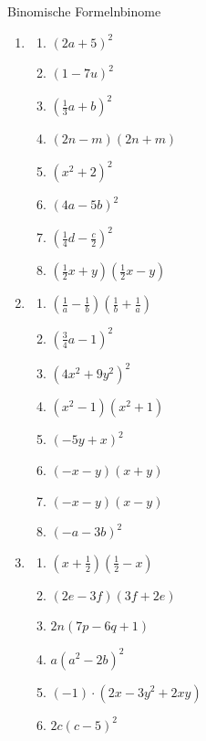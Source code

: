 \clearpage
\begin{ueb}
    {Binomische Formeln}{binome}
    \begin{enumerate}
        \item
              \begin{enumerate}
                  \item \((2a+5)^2\)
                  \item \((1-7u)^2\)
                  \item \(\left(\frac{1}{3}a+b\right)^2\)
                  \item \((2n-m)(2n+m)\)
                  \item \((x^2+2)^2\)
                  \item \((4a-5b)^2\)
                  \item \(\left(\frac{1}{4}d-\frac{c}{2}\right)^2\)
                  \item \(\left(\frac{1}{2}x+y\right)\left(\frac{1}{2}x-y\right)\)
              \end{enumerate}

        \item
              \begin{enumerate}
                  \item \(\left(\frac{1}{a}-\frac{1}{b}\right)
                        \left(\frac{1}{b}+\frac{1}{a}\right)\)
                  \item \(\left(\frac{3}{4}a-1\right)^2\)
                  \item \((4x^2+9y^2)^2\)
                  \item \((x^2-1)(x^2+1)\)
                  \item \((-5y+x)^2\)
                  \item \((-x-y)(x+y)\)
                  \item \((-x-y)(x-y)\)
                  \item \((-a-3b)^2\)
              \end{enumerate}
        \item
              \begin{enumerate}
                  \item \(\left(x+\frac{1}{2}\right)\left(\frac{1}{2}-x\right)\)
                  \item \((2e-3f)(3f+2e)\)
                  \item \(2n(7p-6q+1)\)
                  \item \(a(a^2-2b)^2\)
                  \item \((-1)\cdot(2x-3y^2+2xy)\)
                  \item \(2c(c-5)^2\)
              \end{enumerate}


\end{enumerate}
\end{ueb}
